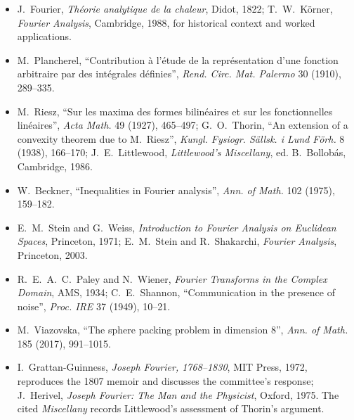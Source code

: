 \begin{itemize}
\item J.~Fourier, \emph{Th\'eorie analytique de la chaleur}, Didot, 1822; T.~W.~K\"orner, \emph{Fourier Analysis}, Cambridge, 1988, for historical context and worked applications.
\item M.~Plancherel, ``Contribution \`a l'\'etude de la repr\'esentation d'une fonction arbitraire par des int\'egrales d\'efinies'', \emph{Rend. Circ. Mat. Palermo} 30 (1910), 289--335.
\item M.~Riesz, ``Sur les maxima des formes bilin\'eaires et sur les fonctionnelles lin\'eaires'', \emph{Acta Math.} 49 (1927), 465--497; G.~O.~Thorin, ``An extension of a convexity theorem due to M.~Riesz'',
\emph{Kungl. Fysiogr. S\"allsk. i Lund F\"orh.} 8 (1938), 166--170; J.~E.~Littlewood, \emph{Littlewood's Miscellany}, ed. B.~Bollob\'as, Cambridge, 1986.
\item W.~Beckner, ``Inequalities in Fourier analysis'', \emph{Ann. of Math.} 102 (1975), 159--182.
\item E.~M.~Stein and G.~Weiss, \emph{Introduction to Fourier Analysis on Euclidean Spaces}, Princeton, 1971; E.~M.~Stein and R.~Shakarchi, \emph{Fourier Analysis}, Princeton, 2003.
\item R.~E.~A.~C.~Paley and N.~Wiener, \emph{Fourier Transforms in the Complex Domain}, AMS, 1934; C.~E.~Shannon, ``Communication in the presence of noise'', \emph{Proc. IRE} 37 (1949), 10--21.
\item M.~Viazovska, ``The sphere packing problem in dimension 8'', \emph{Ann. of Math.} 185 (2017), 991--1015.
\item I.~Grattan-Guinness, \emph{Joseph Fourier, 1768--1830}, MIT Press, 1972, reproduces the 1807 memoir and discusses the committee's response; J.~Herivel, \emph{Joseph Fourier: The Man and the Physicist}, Oxford, 1975. The cited \emph{Miscellany} records Littlewood's assessment of Thorin's argument.
\end{itemize}

